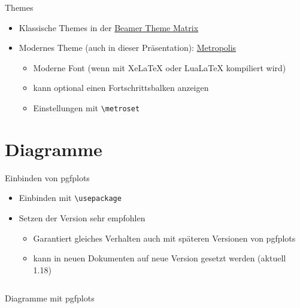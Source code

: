 \documentclass[presentation,aspectratio=169]{beamer}
\begin{document}
\begin{frame}[fragile]{Themes}
  \begin{itemize}
    \item Klassische Themes in der \href{https://hartwork.org/beamer-theme-matrix/}{Beamer Theme Matrix}
    \item Modernes Theme (auch in dieser Präsentation): \href{https://ctan.org/pkg/beamertheme-metropolis}{Metropolis}
      \begin{itemize}
        \item Moderne Font (wenn mit Xe\LaTeX{} oder Lua\LaTeX{} kompiliert wird)
        \item kann optional einen Fortschrittsbalken anzeigen
        \item Einstellungen mit \verb|\metroset|
      \end{itemize}
  \end{itemize}
\end{frame}

\section{Diagramme}

\begin{frame}[fragile]{Einbinden von pgfplots}
  \begin{itemize}
    \item Einbinden mit \verb|\usepackage|
    \item Setzen der Version sehr empfohlen
      \begin{itemize}
        \item Garantiert gleiches Verhalten auch mit späteren Versionen von pgfplots
        \item kann in neuen Dokumenten auf neue Version gesetzt werden (aktuell 1.18)
      \end{itemize}
  \end{itemize}
  \inputminted{latex}{codebeispiele/pgfplots-setup.tex}
\end{frame}

\begin{frame}[fragile]{Diagramme mit pgfplots}
  \begin{columns}
    \begin{column}{.49\textwidth}
      
    \end{column}
    \begin{column}{.5\textwidth}
      \inputminted{latex}{codebeispiele/pgfplots.tex}
    \end{column}
  \end{columns}
\end{frame}
\end{document}
